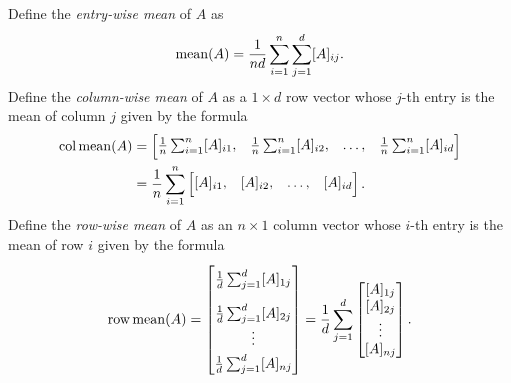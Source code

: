 \begin{definition}
    Define the \textit{entry-wise mean} of \(A\) as
    \begin{equation}
        \label{eqn:matrix-mean}
        \operatorname{mean}(A) = \frac{1}{nd} \sum_{i=1}^{n} \sum_{j=1}^{d} [A]_{ij}.
    \end{equation}
    Define the \textit{column-wise mean} of \(A\) as a \(1 \times d\) row vector whose \(j\)-th entry is the mean of column \(j\) given by the formula
    \begin{equation}
        \label{eqn:column-mean}
        \begin{aligned}
            \colmean(A)
            &= \begin{bmatrix}
                \rule[-.5em]{0em}{1em}
                \frac{1}{n} \sum_{i=1}^{n} [A]_{i1}, &
                \frac{1}{n} \sum_{i=1}^{n} [A]_{i2}, &
                \dots, &
                \frac{1}{n} \sum_{i=1}^{n} [A]_{id}
            \end{bmatrix}\\
            &= \frac{1}{n} \sum_{i=1}^{n} \begin{bmatrix}
                \rule[-.5em]{0em}{1em}
                [A]_{i1}, &
                [A]_{i2}, &
                \dots, &
                [A]_{id}
            \end{bmatrix}.
        \end{aligned}
    \end{equation}
    Define the \textit{row-wise mean} of \(A\) as an \(n \times 1\) column vector whose \(i\)-th entry is the mean of row \(i\) given by the formula
    \begin{equation}
        \label{eqn:row-mean}
        \rowmean(A) = \begin{bmatrix}
            \rule{0em}{1.5em}
            \frac{1}{d} \sum_{j=1}^{d} [A]_{1j} \\
            \rule{0em}{2em}
            \frac{1}{d} \sum_{j=1}^{d} [A]_{2j} \\
            \vdots \\
            \rule[-.7em]{0em}{2em}
            \frac{1}{d} \sum_{j=1}^{d} [A]_{nj}
        \end{bmatrix}
        = \frac{1}{d} \sum_{j=1}^{d} \begin{bmatrix}
            [A]_{1j}\\
            [A]_{2j}\\
            \vdots \\
            [A]_{nj}\\
        \end{bmatrix}.
    \end{equation}
\end{definition}

